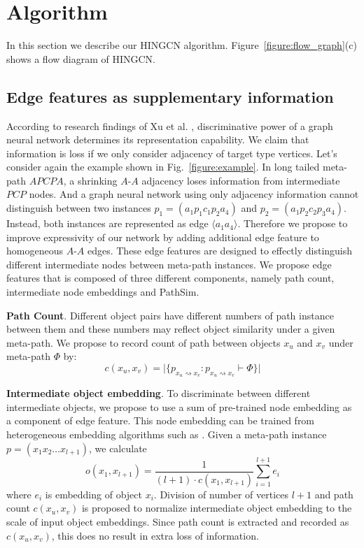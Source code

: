 \section{Algorithm}
\label{sec:algorithm}

In this section we describe our HINGCN algorithm. Figure~\ref{figure:flow_graph}(c) shows a flow diagram of HINGCN. 

\subsection{Edge features as supplementary information}
\label{sec:edge}
According to research findings of Xu et al. \cite{XuHLJ19}, discriminative power of a graph neural network determines its representation capability.
We claim that information is loss if we only consider adjacency of target type vertices.
Let's consider again the example shown in Fig.~\ref{figure:example}. In long tailed meta-path $APCPA$, a shrinking $A$-$A$ adjacency loses information from intermediate $PCP$ nodes. And a graph neural network using only adjacency information cannot distinguish between two instances $p_1 = (a_1 p_1 c_1 p_2 a_4)$ and $p_2 = (a_1 p_2 c_2 p_3 a_4)$. Instead, both instances are represented as edge $\langle a_1 a_4\rangle$.
Therefore we propose to improve expressivity of our network by adding additional edge feature to homogeneous $A$-$A$ edges. These edge features are designed to effectly distinguish different intermediate nodes between meta-path instances.
We propose edge features that is composed of three different components, namely path count, intermediate node embeddings and PathSim\citep{SunHYYW11}.

\noindent{\small$\bullet$}\textbf{Path Count}. Different object pairs have different numbers of path instance between them and these numbers may reflect object similarity under a given meta-path. We propose to record count of path between objects $x_u$ and $x_v$ under meta-path $\Phi$ by: 
\begin{equation*}
c(x_u,x_v) = \vert\{ p_{x_u \rightsquigarrow x_v}:p_{x_u \rightsquigarrow x_v} \vdash \Phi \}\vert
\end{equation*}

\noindent{\small$\bullet$}\textbf{Intermediate object embedding}. 
To discriminate between different intermediate objects, we propose to use a sum of pre-trained node embedding as a component of edge feature. This node embedding can be trained from heterogeneous embedding algorithms such as \cite{GroverL16,DongCS17}.
Given a meta-path instance $p = (x_1x_2\ldots x_{l+1})$, we calculate
\begin{equation*}
o(x_1,x_{l+1}) = \dfrac{1}{(l+1) \cdot c(x_1,x_{l+1})} \sum\limits_{i=1}^{l+1} e_i
\end{equation*}
where $e_i$ is embedding of object $x_i$. Division of number of vertices $l+1$ and path count $c(x_u,x_v)$ is proposed to normalize intermediate object embedding to the scale of input object embeddings. Since path count is extracted and recorded as $c(x_u,x_v)$, this does no result in extra loss of information.

